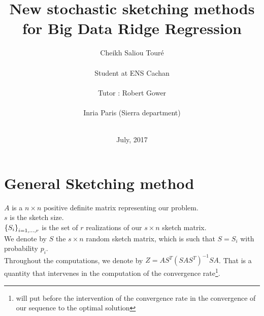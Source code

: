 


\usepackage[colorinlistoftodos,bordercolor=orange,backgroundcolor=orange!20,linecolor=orange,textsize=scriptsize]{todonotes}
\newcommand{\rob}[1]{\todo[inline]{\textbf{Robert: }#1}}
\newcommand{\cheikh}[1]{\todo[inline]{\textbf{Cheikh: }#1}}

\title{New stochastic sketching methods for Big Data Ridge Regression}
\author{Cheikh Saliou Tour\'e \\ \\
Student at ENS Cachan\\\\
Tutor : Robert Gower \\ \\
Inria Paris (Sierra department)\\\\ }




\date{July, 2017}




\renewcommand\bibname{References}
%
%
%
%
\tableofcontents
\newpage

\chapter{General Sketching method}

$A$ is a $n \times n$ positive definite matrix representing our problem.\\ 
$s$ is the sketch size.\\
 $\left\{S_{i}\right\}_{i=1,\dots,r}$ is the set of $r$ realizations of our $s\times n$ sketch matrix.\\
We denote by $S$ the $s\times n$ random sketch matrix, which is such that $S = S_{i}$ with probability $p_{i}$. \\ 
 
Throughout the computations, we denote by $Z = A S^{T} (S A S^{T})^{-1} S A$. That is a quantity that intervenes in the computation of the convergence rate\footnote{will put before the intervention of the convergence rate in the convergence of our sequence to the optimal solution }.\\



